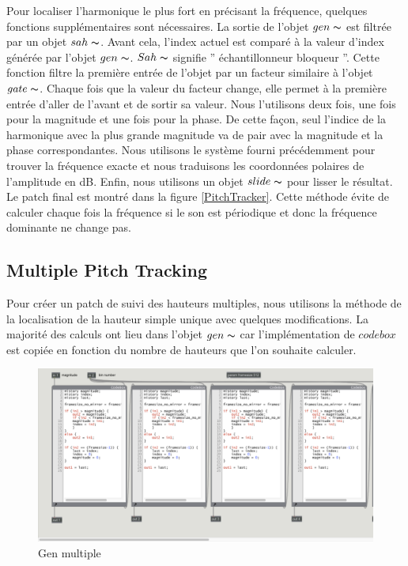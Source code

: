 Pour localiser l’harmonique le plus fort en précisant la fréquence, quelques fonctions supplémentaires sont nécessaires. La sortie de l'objet $ gen \thicksim $ est filtrée par un objet $ sah \thicksim $. Avant cela, l'index actuel est comparé à la valeur d'index générée par l'objet $ gen \thicksim $. $ Sah \thicksim $ signifie '' échantillonneur bloqueur ''. Cette fonction filtre la première entrée de l'objet par un facteur similaire à l'objet $ gate \thicksim $. Chaque fois que la valeur du facteur change, elle permet à la première entrée d'aller de l'avant et de sortir sa valeur. Nous l'utilisons deux fois, une fois pour la magnitude et une fois pour la phase. De cette façon, seul l’indice de la harmonique avec la plus grande magnitude va de pair avec la magnitude et la phase correspondantes. Nous utilisons le système fourni précédemment pour trouver la fréquence exacte et nous traduisons les coordonnées polaires de l'amplitude en dB. Enfin, nous utilisons un objet $ slide \thicksim $ pour lisser le résultat. Le patch final est montré dans la figure \ref{PitchTracker}. Cette méthode évite de calculer chaque fois la fréquence si le son est périodique et donc la fréquence dominante ne change pas.

\subsection{Multiple Pitch Tracking}

Pour créer un patch de suivi des hauteurs multiples, nous utilisons la méthode de la localisation de la hauteur simple unique avec quelques modifications. La majorité des calculs ont lieu dans l'objet $ gen \thicksim $ car l'implémentation de $ codebox $ est copiée en fonction du nombre de hauteurs que l'on souhaite calculer.

    \begin{figure}
        \centering
        \includegraphics[width = \textwidth]{Graphs/GenMultiple.png}
        \caption{Gen multiple}
        \label{GenMultiple}
    \end{figure}

